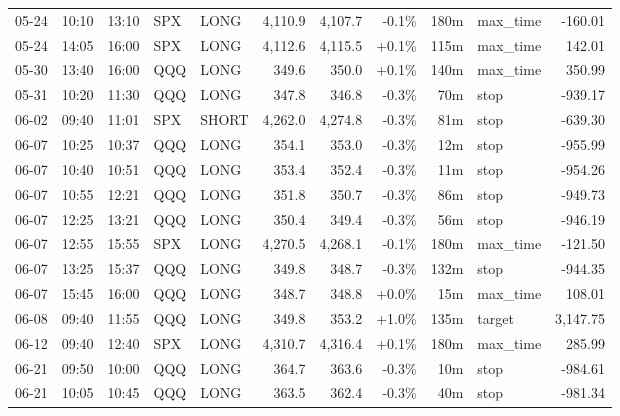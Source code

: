 \documentclass[11pt,a4paper,twoside]{article}
\begin{document}
\begin{center}
\begin{longtable}{>{\color{txtmain}}l l l l l r r r r >{\color{txtmain}}l r}
05-24 & 10:10 & 13:10 & SPX & LONG & 4,110.9 & 4,107.7 & \textcolor{lossred}{-0.1\%} & 180m & max\_time & \textcolor{lossred}{-160.01} \\
05-24 & 14:05 & 16:00 & SPX & LONG & 4,112.6 & 4,115.5 & \textcolor{wingreen}{+0.1\%} & 115m & max\_time & \textcolor{wingreen}{142.01} \\
05-30 & 13:40 & 16:00 & QQQ & LONG & 349.6 & 350.0 & \textcolor{wingreen}{+0.1\%} & 140m & max\_time & \textcolor{wingreen}{350.99} \\
05-31 & 10:20 & 11:30 & QQQ & LONG & 347.8 & 346.8 & \textcolor{lossred}{-0.3\%} & 70m & stop & \textcolor{lossred}{-939.17} \\
06-02 & 09:40 & 11:01 & SPX & SHORT & 4,262.0 & 4,274.8 & \textcolor{lossred}{-0.3\%} & 81m & stop & \textcolor{lossred}{-639.30} \\
06-07 & 10:25 & 10:37 & QQQ & LONG & 354.1 & 353.0 & \textcolor{lossred}{-0.3\%} & 12m & stop & \textcolor{lossred}{-955.99} \\
06-07 & 10:40 & 10:51 & QQQ & LONG & 353.4 & 352.4 & \textcolor{lossred}{-0.3\%} & 11m & stop & \textcolor{lossred}{-954.26} \\
06-07 & 10:55 & 12:21 & QQQ & LONG & 351.8 & 350.7 & \textcolor{lossred}{-0.3\%} & 86m & stop & \textcolor{lossred}{-949.73} \\
06-07 & 12:25 & 13:21 & QQQ & LONG & 350.4 & 349.4 & \textcolor{lossred}{-0.3\%} & 56m & stop & \textcolor{lossred}{-946.19} \\
06-07 & 12:55 & 15:55 & SPX & LONG & 4,270.5 & 4,268.1 & \textcolor{lossred}{-0.1\%} & 180m & max\_time & \textcolor{lossred}{-121.50} \\
06-07 & 13:25 & 15:37 & QQQ & LONG & 349.8 & 348.7 & \textcolor{lossred}{-0.3\%} & 132m & stop & \textcolor{lossred}{-944.35} \\
06-07 & 15:45 & 16:00 & QQQ & LONG & 348.7 & 348.8 & \textcolor{wingreen}{+0.0\%} & 15m & max\_time & \textcolor{wingreen}{108.01} \\
06-08 & 09:40 & 11:55 & QQQ & LONG & 349.8 & 353.2 & \textcolor{wingreen}{+1.0\%} & 135m & target & \textcolor{wingreen}{3,147.75} \\
06-12 & 09:40 & 12:40 & SPX & LONG & 4,310.7 & 4,316.4 & \textcolor{wingreen}{+0.1\%} & 180m & max\_time & \textcolor{wingreen}{285.99} \\
06-21 & 09:50 & 10:00 & QQQ & LONG & 364.7 & 363.6 & \textcolor{lossred}{-0.3\%} & 10m & stop & \textcolor{lossred}{-984.61} \\
06-21 & 10:05 & 10:45 & QQQ & LONG & 363.5 & 362.4 & \textcolor{lossred}{-0.3\%} & 40m & stop & \textcolor{lossred}{-981.34} \\

\end{longtable}
\end{center}
\end{document}
